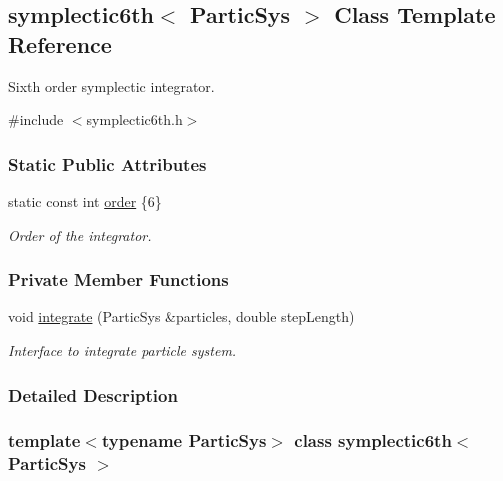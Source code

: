 \hypertarget{classsymplectic6th}{}\subsection{symplectic6th$<$ Partic\+Sys $>$ Class Template Reference}
\label{classsymplectic6th}


Sixth order symplectic integrator.  




{\ttfamily \#include $<$symplectic6th.\+h$>$}

\subsubsection*{Static Public Attributes}
\begin{DoxyCompactItemize}
\item 
static const int \mbox{\hyperlink{classsymplectic6th_a7f4232a8639d27aeb0890476176e8553}{order}} \{6\}
\begin{DoxyCompactList}\small\item\em Order of the integrator. \end{DoxyCompactList}\end{DoxyCompactItemize}
\subsubsection*{Private Member Functions}
\begin{DoxyCompactItemize}
\item 
void \mbox{\hyperlink{classsymplectic6th_a204014a9214f444e23a1a75cbbae2b86}{integrate}} (Partic\+Sys \&particles, double step\+Length)
\begin{DoxyCompactList}\small\item\em Interface to integrate particle system. \end{DoxyCompactList}\end{DoxyCompactItemize}


\subsubsection{Detailed Description}
\subsubsection*{template$<$typename Partic\+Sys$>$\newline
class symplectic6th$<$ Partic\+Sys $>$}

